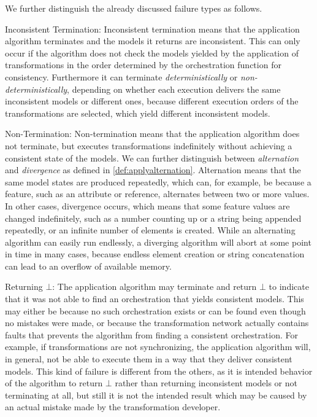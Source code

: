 We further distinguish the already discussed failure types as follows.
\begin{properdescription}
    \item[Inconsistent Termination:] %
    Inconsistent termination means that the application algorithm terminates and the models it returns are inconsistent.
    This can only occur if the algorithm does not check the models yielded by the application of transformations in the order determined by the orchestration function for consistency.
    Furthermore it can terminate \emph{deterministically} or \emph{non-deterministically}, depending on whether each execution delivers the same inconsistent models or different ones, because different execution orders of the transformations are selected, which yield different inconsistent models.

    \item[Non-Termination:] %
    Non-termination means that the application algorithm does not terminate, but executes transformations indefinitely without achieving a consistent state of the models.
    We can further distinguish between \emph{alternation} and \emph{divergence} as defined in \autoref{def:applyalternation}.
    Alternation means that the same model states are produced repeatedly, which can, for example, be because a feature, such as an attribute or reference, alternates between two or more values.
    In other cases, divergence occurs, which means that some feature values are changed indefinitely, such as a number counting up or a string being appended repeatedly, or an infinite number of elements is created.
    While an alternating algorithm can easily run endlessly, a diverging algorithm will abort at some point in time in many cases, because endless element creation or string concatenation can lead to an overflow of available memory.
    
    \item[Returning $\bot$:] %
    The application algorithm may terminate and return $\bot$ to indicate that it was not able to find an orchestration that yields consistent models.
    This may either be because no such orchestration exists or can be found even though no mistakes were made, or because the transformation network actually contains faults that prevents the algorithm from finding a consistent orchestration.
    For example, if transformations are not synchronizing, the application algorithm will, in general, not be able to execute them in a way that they deliver consistent models.
    This kind of failure is different from the others, as it is intended behavior of the algorithm to return $\bot$ rather than returning inconsistent models or not terminating at all, but still it is not the intended result which may be caused by an actual mistake made by the transformation developer.


\end{properdescription}
